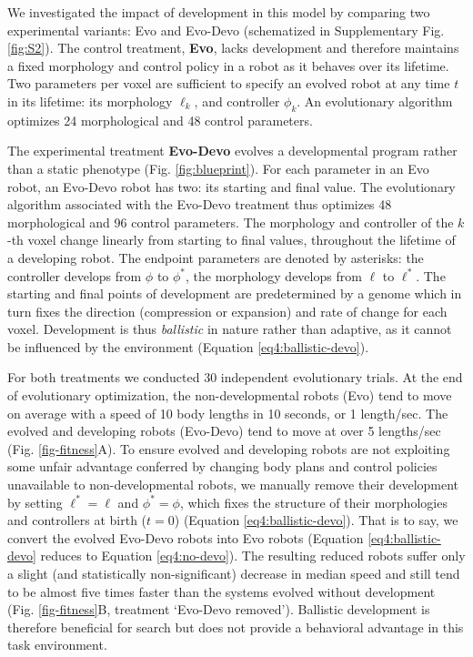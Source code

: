 We investigated the impact of development in this model by comparing two experimental variants: Evo and Evo-Devo (schematized in Supplementary Fig. \ref{fig:S2}). %
The control treatment, \textbf{Evo}, lacks development and therefore maintains a fixed morphology and control policy in a robot as it behaves over its lifetime. 
Two parameters per voxel are sufficient to specify an evolved robot at any time $t$ in its lifetime: its morphology $\ell_k$, and controller $\phi_k$.
An evolutionary algorithm optimizes 24 morphological and 48 control parameters.

The experimental treatment \textbf{Evo-Devo} evolves a developmental program rather than a static phenotype (Fig. \ref{fig:blueprint}). 
For each parameter in an Evo robot, an Evo-Devo robot has two: its starting and final value.
The evolutionary algorithm associated with the Evo-Devo treatment thus optimizes 48 morphological and 96 control parameters.
The morphology and controller of the $k$-th voxel change linearly from starting to final values, throughout the lifetime of a developing robot.
The endpoint parameters are denoted by asterisks: the controller develops from $\phi$ to $\phi^*$, the morphology develops from $\ell$ to $\ell^*$.
The starting and final points of development are predetermined by a genome which in turn fixes the direction (compression or expansion) and rate of change for each voxel.
Development is thus \textit{ballistic} in nature rather than adaptive, as it cannot be influenced by the environment (Equation \ref{eq4:ballistic-devo}). 


For both treatments we conducted 30 independent evolutionary trials.
At the end of evolutionary optimization, the non-developmental robots (Evo) tend to move on average with a speed of 10 body lengths in 10 seconds, or 1 length/sec. The evolved and developing robots (Evo-Devo) tend to move at over 5 lengths/sec (Fig. \ref{fig-fitness}A).
To ensure evolved and developing robots are not exploiting some unfair advantage conferred by changing body plans and control policies unavailable to non-developmental robots, we manually remove their development by setting $\ell^*=\ell$ and $\phi^*=\phi$, which fixes the structure of their morphologies and controllers at birth ($t=0$) (Equation \ref{eq4:ballistic-devo}). 
That is to say, we convert the evolved Evo-Devo robots into Evo robots (Equation \ref{eq4:ballistic-devo} reduces to Equation \ref{eq4:no-devo}).
The resulting reduced robots suffer only a slight (and statistically non-significant) decrease in median speed and still tend to be almost five times faster than the systems evolved without development (Fig. \ref{fig-fitness}B, treatment `Evo-Devo removed').
Ballistic development is therefore beneficial for search but does not provide a behavioral advantage in this task environment.


